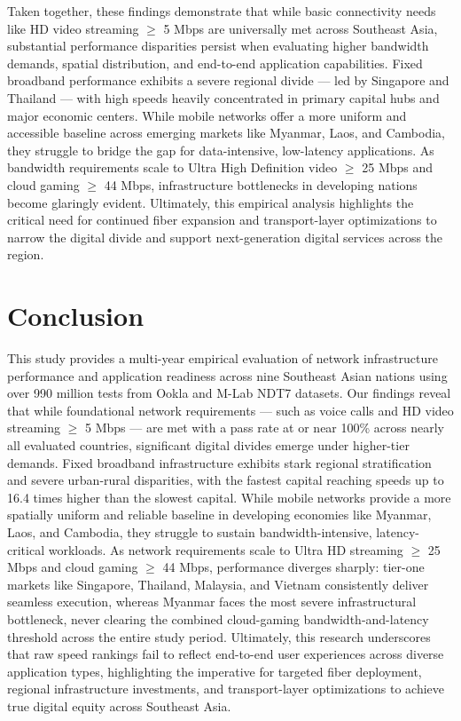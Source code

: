 \documentclass[sigconf,anonymous,review]{acmart}
\begin{document}
Taken together, these findings demonstrate that while basic connectivity
needs like HD video streaming $\geq$ 5 Mbps are universally met across
Southeast Asia, substantial performance disparities persist when evaluating
higher bandwidth demands, spatial distribution, and end-to-end application
capabilities. Fixed broadband performance exhibits a severe regional
divide --- led by Singapore and Thailand --- with high speeds heavily
concentrated in primary capital hubs and major economic centers. While
mobile networks offer a more uniform and accessible baseline across
emerging markets like Myanmar, Laos, and Cambodia, they struggle to bridge
the gap for data-intensive, low-latency applications. As bandwidth
requirements scale to Ultra High Definition video $\geq$ 25 Mbps and cloud
gaming $\geq$ 44 Mbps, infrastructure bottlenecks in developing nations
become glaringly evident. Ultimately, this empirical analysis highlights
the critical need for continued fiber expansion and transport-layer
optimizations to narrow the digital divide and support next-generation
digital services across the region.

\section{Conclusion}
This study provides a multi-year empirical evaluation of network
infrastructure performance and application readiness across nine Southeast
Asian nations using over 990 million tests from Ookla and M-Lab NDT7
datasets. Our findings reveal that while foundational network
requirements --- such as voice calls and HD video streaming $\geq$ 5 Mbps ---
are met with a pass rate at or near 100\% across nearly all evaluated
countries, significant digital divides emerge under higher-tier demands.
Fixed broadband infrastructure exhibits stark regional stratification and
severe urban-rural disparities, with the fastest capital reaching speeds up
to 16.4 times higher than the slowest capital. While mobile networks
provide a more spatially uniform and reliable baseline in developing
economies like Myanmar, Laos, and Cambodia, they struggle to sustain
bandwidth-intensive, latency-critical workloads. As network requirements
scale to Ultra HD streaming $\geq$ 25 Mbps and cloud gaming $\geq$ 44 Mbps,
performance diverges sharply: tier-one markets like Singapore, Thailand,
Malaysia, and Vietnam consistently deliver seamless execution, whereas
Myanmar faces the most severe infrastructural bottleneck, never clearing
the combined cloud-gaming bandwidth-and-latency threshold across the entire
study period. Ultimately, this research underscores that raw speed rankings
fail to reflect end-to-end user experiences across diverse application
types, highlighting the imperative for targeted fiber deployment, regional
infrastructure investments, and transport-layer optimizations to achieve
true digital equity across Southeast Asia.
\end{document}
